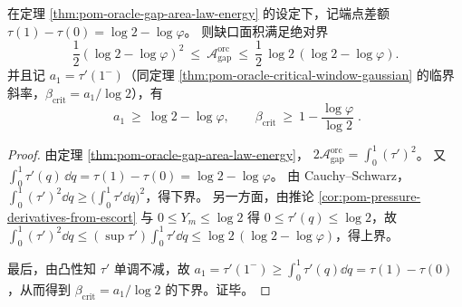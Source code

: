 \begin{corollary}[普适双边界与临界预算的普适下界]\label{cor:pom-oracle-gap-area-universal-bounds-beta-crit}
在定理 \ref{thm:pom-oracle-gap-area-law-energy} 的设定下，记端点差额
\(
\tau(1)-\tau(0)=\log 2-\log\varphi
\)。
则缺口面积满足绝对界
\[
\boxed{\;
\frac12(\log 2-\log\varphi)^2\ \le\ \mathcal{A}^{\mathrm{orc}}_{\mathrm{gap}}\ \le\ \frac12\,\log 2\,(\log 2-\log\varphi).\;}
\]
并且记 \(a_1=\tau'(1^-)\)（同定理 \ref{thm:pom-oracle-critical-window-gaussian} 的临界斜率，\(\beta_{\mathrm{crit}}=a_1/\log 2\)），有
\[
\boxed{\;
a_1\ \ge\ \log 2-\log\varphi,
\qquad
\beta_{\mathrm{crit}}\ \ge\ 1-\frac{\log\varphi}{\log 2}\; }.
\]
\end{corollary}
\begin{proof}
由定理 \ref{thm:pom-oracle-gap-area-law-energy}，
\(
2\mathcal{A}^{\mathrm{orc}}_{\mathrm{gap}}=\int_0^1(\tau')^2
\)。
又
\(
\int_0^1\tau'(q)\,\dd q=\tau(1)-\tau(0)=\log 2-\log\varphi
\)。
由 Cauchy--Schwarz，
\(
\int_0^1(\tau')^2\dd q\ge \bigl(\int_0^1\tau'\dd q\bigr)^2
\)，得下界。
另一方面，由推论 \ref{cor:pom-pressure-derivatives-from-escort} 与 \(0\le Y_m\le \log 2\) 得 \(0\le \tau'(q)\le \log 2\)，故
\(
\int_0^1(\tau')^2\dd q\le (\sup\tau')\int_0^1\tau'\dd q\le \log 2\,(\log 2-\log\varphi)
\)，得上界。
\par
最后，由凸性知 \(\tau'\) 单调不减，故 \(a_1=\tau'(1^-)\ge \int_0^1\tau'(q)\dd q=\tau(1)-\tau(0)\)，从而得到 \(\beta_{\mathrm{crit}}=a_1/\log 2\) 的下界。证毕。
\end{proof}

